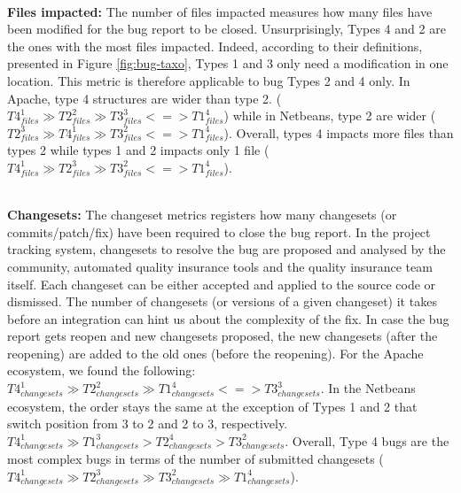 \\ \vspace{0.1cm} {\bf Files impacted:} The number of files impacted measures how many files have been modified for the bug report to be closed.
Unsurprisingly, Types 4 and 2 are the ones with the most files impacted.
Indeed, according to their definitions, presented in Figure \ref{fig:bug-taxo}, Types 1 and 3 only need a modification in one location. This metric is therefore applicable to  bug Types 2 and 4 only.
In Apache, type 4 structures are wider than type 2.
(
$
T4_{files}^1
 \gg
T2_{files}^2
 \gg
T3_{files}^3
< = >
T1_{files}^4
$)
while in Netbeans, type 2 are wider (
$
T2_{files}^3
 \gg
T4_{files}^1
 \gg
T3_{files}^2
< = >
T1_{files}^4
$).
Overall, types 4 impacts more files than types 2 while types 1 and 2 impacts only 1 file (
$
T4_{files}^1
 \gg
T2_{files}^3
 \gg
T3_{files}^2
< = >
T1_{files}^4
$).

\\ \vspace{0.1cm} {\bf Changesets: } The changeset metrics registers how many changesets (or commits/patch/fix) have been required to close the bug report.
In the project tracking system, changesets to resolve the bug are proposed and analysed by the community, automated quality insurance tools and the quality insurance team itself.
Each changeset can be either accepted and applied to the source code or dismissed.
The number of changesets (or versions of a given changeset) it takes before an integration can hint us about the complexity of the fix.
In case the bug report gets reopen and new changesets proposed, the new changesets (after the reopening) are added to the old ones (before the reopening).
For the Apache ecosystem, we found the following:
$
T4_{changesets}^1
 \gg
T2_{changesets}^2
 \gg
T1_{changesets}^4
 <=>
T3_{changesets}^3
$.
In the Netbeans ecosystem, the order stays the same at the exception of Types 1 and 2 that switch position from 3 to 2 and 2 to 3, respectively.
$
T4_{changesets}^1
 \gg
T1_{changesets}^3
 >
T2_{changesets}^4
 >
T3_{changesets}^2
$.
Overall, Type 4 bugs are the most complex bugs in terms of the number of submitted changesets (
$
T4_{changesets}^1
 \gg
T2_{changesets}^3
 \gg
T3_{changesets}^2
 \gg
T1_{changesets}^4
$).

